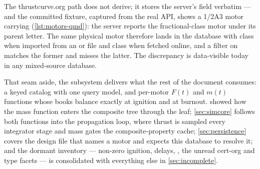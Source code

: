 \begin{hardfail}
The thrustcurve.org path does not derive; it stores the server's 
field verbatim  --- and the committed fixture,
captured from the real API, shows a 1/2A3 motor carrying
 
(\cref{lst:motors-qmd}): the server reports the fractional-class motor under its parent
letter. The same physical motor therefore lands in the database with class 
when imported from an  or  file and class  when fetched
online, and a  filter on 
 matches the former and misses the latter. The
discrepancy is data-visible today in any mixed-source database. \fail
\end{hardfail}

That seam aside, the subsystem delivers what the rest of the document consumes: a keyed
catalog with one query model, and per-motor $F(t)$ and $m(t)$ functions whose books
balance exactly at ignition and at burnout.  showed how the mass function
enters the composite tree through the  leaf; \cref{sec:simcore} follows
both functions into the propagation loop, where thrust is sampled every integrator stage
and mass gates the composite-property cache; \cref{sec:persistence} covers the design
file that names a motor and expects this database to resolve it; and the dormant
inventory --- non-zero ignition, delays, , the unread cert-org and type facets
--- is consolidated with everything else in \cref{sec:incomplete}.
